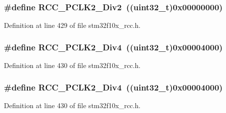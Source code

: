 \subsubsection[{\texorpdfstring{R\+C\+C\+\_\+\+P\+C\+L\+K2\+\_\+\+Div2}{RCC_PCLK2_Div2}}]{\setlength{\rightskip}{0pt plus 5cm}\#define R\+C\+C\+\_\+\+P\+C\+L\+K2\+\_\+\+Div2~(({\bf uint32\+\_\+t})0x00000000)}\hypertarget{group___a_d_c__clock__source_ga6c341971f2f161320ad150faa3636b41}{}\label{group___a_d_c__clock__source_ga6c341971f2f161320ad150faa3636b41}


Definition at line 429 of file stm32f10x\+\_\+rcc.\+h.

\subsubsection[{\texorpdfstring{R\+C\+C\+\_\+\+P\+C\+L\+K2\+\_\+\+Div4}{RCC_PCLK2_Div4}}]{\setlength{\rightskip}{0pt plus 5cm}\#define R\+C\+C\+\_\+\+P\+C\+L\+K2\+\_\+\+Div4~(({\bf uint32\+\_\+t})0x00004000)}\hypertarget{group___a_d_c__clock__source_gaecc7a9370fb7d7772d9c90888792084c}{}\label{group___a_d_c__clock__source_gaecc7a9370fb7d7772d9c90888792084c}


Definition at line 430 of file stm32f10x\+\_\+rcc.\+h.

\subsubsection[{\texorpdfstring{R\+C\+C\+\_\+\+P\+C\+L\+K2\+\_\+\+Div4}{RCC_PCLK2_Div4}}]{\setlength{\rightskip}{0pt plus 5cm}\#define R\+C\+C\+\_\+\+P\+C\+L\+K2\+\_\+\+Div4~(({\bf uint32\+\_\+t})0x00004000)}\hypertarget{group___a_d_c__clock__source_gaecc7a9370fb7d7772d9c90888792084c}{}\label{group___a_d_c__clock__source_gaecc7a9370fb7d7772d9c90888792084c}


Definition at line 430 of file stm32f10x\+\_\+rcc.\+h.

